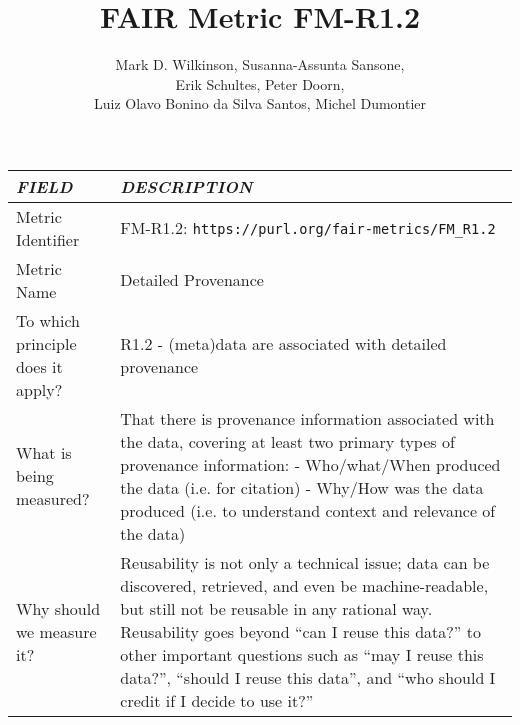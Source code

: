 \documentclass[english]{article}
\begin{document}
\title{FAIR Metric FM-R1.2}

\author{Mark D. Wilkinson, Susanna-Assunta Sansone, \\Erik Schultes, Peter Doorn,\\ 
Luiz Olavo Bonino da Silva Santos, Michel Dumontier}

\maketitle

\newpage





\begin{longtable}{|p{5cm}|p{9cm}|}


\hline
\emph{FIELD} & \emph{DESCRIPTION} \\
\hline
Metric Identifier &   FM-R1.2: \verb"https://purl.org/fair-metrics/FM_R1.2"
\\


\hline
Metric Name &   


Detailed Provenance


 \\



\hline
To which principle does it apply? &   


R1.2 - (meta)data are associated with detailed provenance

\\



\hline
What is being measured? & 


That there is provenance information associated with the data, covering at least two primary types of provenance information:\newline 
\newline 
- Who/what/When produced the data (i.e. for citation)\newline 
- Why/How was the data produced (i.e. to understand context and relevance of the data)

\\



\hline
Why should we measure it? & 


Reusability is not only a technical issue; data can be discovered, retrieved, and even be machine-readable, but still not be reusable in any rational way.  Reusability goes beyond “can I reuse this data?” to other important questions such as “may I reuse this data?”, “should I reuse this data”, and “who should I credit if I decide to use it?”



\end{longtable}
\end{document}

